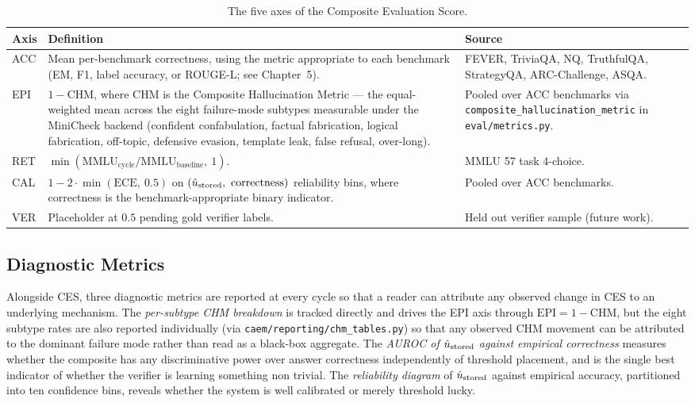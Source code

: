\begin{table}[H]
\centering
\caption{The five axes of the Composite Evaluation Score.}
\label{tab:ces-axes}
\small
\begin{tabular}{@{}p{1.2cm}p{6.0cm}p{6.4cm}@{}}
\toprule
\textbf{Axis} & \textbf{Definition} & \textbf{Source} \\
\midrule
ACC & Mean per-benchmark correctness, using the metric appropriate to each benchmark (EM, F1, label accuracy, or ROUGE-L; see Chapter~5). & FEVER, TriviaQA, NQ, TruthfulQA, StrategyQA, ARC-Challenge, ASQA. \\
EPI & $1 - \mathrm{CHM}$, where CHM is the Composite Hallucination Metric --- the equal-weighted mean across the eight failure-mode subtypes measurable under the MiniCheck backend (confident confabulation, factual fabrication, logical fabrication, off-topic, defensive evasion, template leak, false refusal, over-long). & Pooled over ACC benchmarks via \texttt{composite\_hallucination\_metric} in \texttt{eval/metrics.py}. \\
RET & $\min(\mathrm{MMLU}_{\text{cycle}} / \mathrm{MMLU}_{\text{baseline}},\ 1)$. & MMLU 57 task 4-choice. \\
CAL & $1 - 2 \cdot \min(\mathrm{ECE},\ 0.5)$ on $(\hat{u}_{\text{stored}},\ \text{correctness})$ reliability bins, where correctness is the benchmark-appropriate binary indicator. & Pooled over ACC benchmarks. \\
VER & Placeholder at $0.5$ pending gold verifier labels. & Held out verifier sample (future work). \\
\bottomrule
\end{tabular}
\end{table}

\subsection{Diagnostic Metrics}
\label{sec:diagnostics}

Alongside CES, three diagnostic metrics are reported at every cycle so that a reader can attribute any observed change in CES to an underlying mechanism. The \emph{per-subtype CHM breakdown} is tracked directly and drives the EPI axis through $\mathrm{EPI} = 1 - \mathrm{CHM}$, but the eight subtype rates are also reported individually (via \texttt{caem/reporting/chm\_tables.py}) so that any observed CHM movement can be attributed to the dominant failure mode rather than read as a black-box aggregate. The \emph{AUROC of $\hat{u}_{\text{stored}}$ against empirical correctness} measures whether the composite has any discriminative power over answer correctness independently of threshold placement, and is the single best indicator of whether the verifier is learning something non trivial. The \emph{reliability diagram} of $\hat{u}_{\text{stored}}$ against empirical accuracy, partitioned into ten confidence bins, reveals whether the system is well calibrated or merely threshold lucky.

